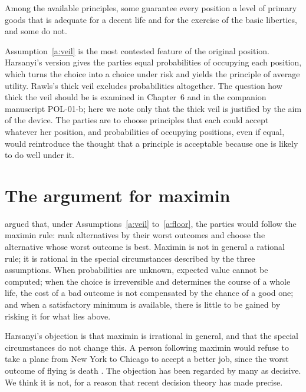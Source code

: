 \documentclass{situationist-preprint}
\begin{document}
\begin{assumption}\label{a:floor}
Among the available principles, some guarantee every position a level of primary goods that is adequate for a decent life and for the exercise of the basic liberties, and some do not.
\end{assumption}

Assumption~\ref{a:veil} is the most contested feature of the original position. Harsanyi's version gives the parties equal probabilities of occupying each position, which turns the choice into a choice under risk and yields the principle of average utility. Rawls's thick veil excludes probabilities altogether. The question how thick the veil should be is examined in Chapter~6 and in the companion manuscript POL-01-b; here we note only that the thick veil is justified by the aim of the device. The parties are to choose principles that each could accept whatever her position, and probabilities of occupying positions, even if equal, would reintroduce the thought that a principle is acceptable because one is likely to do well under it.

\section{The argument for maximin}

\citet[\S 26]{Rawls1971} argued that, under Assumptions~\ref{a:veil} to~\ref{a:floor}, the parties would follow the maximin rule: rank alternatives by their worst outcomes and choose the alternative whose worst outcome is best. Maximin is not in general a rational rule; it is rational in the special circumstances described by the three assumptions. When probabilities are unknown, expected value cannot be computed; when the choice is irreversible and determines the course of a whole life, the cost of a bad outcome is not compensated by the chance of a good one; and when a satisfactory minimum is available, there is little to be gained by risking it for what lies above.

Harsanyi's objection is that maximin is irrational in general, and that the special circumstances do not change this. A person following maximin would refuse to take a plane from New York to Chicago to accept a better job, since the worst outcome of flying is death \citep{Harsanyi1975}. The objection has been regarded by many as decisive. We think it is not, for a reason that recent decision theory has made precise.
\end{document}
